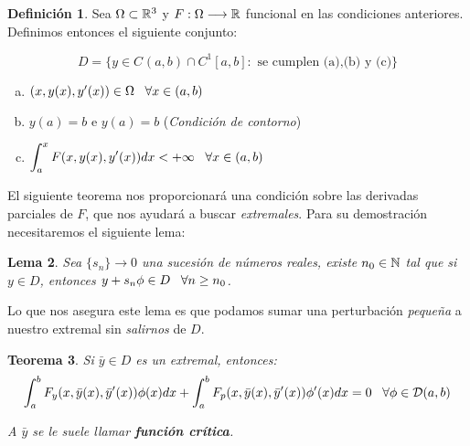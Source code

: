 \documentclass[12pt]{article}
\newtheorem{theorem}{Teorema}
\newtheorem{lemma}[theorem]{Lema}
\theoremstyle{definition}
\newtheorem{definition}[theorem]{Definición}
\theoremstyle{remark}
\newcommand{\continuas}[1][]{C^{ #1 }[a,b]}
\newcommand{\continuasabierto}[1][]{C^{ #1 }(a,b)}
\newcommand{\soportecompacto}{\mathcal{D}(a,b)}
\newcommand{\xcero}{(a,b)}
\newcommand{\fvariaciones}{F(x,y(x),y'(x))}
\begin{document}
\begin{definition} 

Sea $\Omega\subset\mathbb{R}^3$ y $F:\Omega\longrightarrow \mathbb{R}$ funcional en las condiciones anteriores. Definimos entonces el siguiente conjunto:

\begin{equation}\label{espaciofunciones}
D=\{y\in\continuasabierto\cap\continuas[1]: \text{ se cumplen (a),(b) y (c)}\}
\end{equation}

\begin{enumerate}[(a)]

\item $(x,y(x),y'(x))\in\Omega \espacio \forall x\in\xcero$
\item $y(a)=b$ e $y(a)=b$ (\textit{Condición de contorno})
\item $\displaystyle\int_{a}^x\fvariaciones dx<+\infty \espacio \forall x\in \xcero$ 
\end{enumerate}

\end{definition}

El siguiente teorema nos proporcionará una condición sobre las derivadas parciales de $F$, que nos ayudará a buscar \textit{extremales}. Para su demostración necesitaremos el siguiente lema:

\begin{lemma}
\label{lemmatecnico}
Sea $\{s_n\}\longrightarrow 0$ una sucesión de números reales, existe $n_0\in\mathbb{N}$ tal que si $y\in D$, entonces $y+s_n\phi\in D \;\;\; \forall n\geq n_0$.
\end{lemma}

Lo que nos asegura este lema es que podamos sumar una perturbación \textit{pequeña} a nuestro extremal sin \textit{salirnos} de $D$.

\begin{theorem}
\label{theorem:1.7}
Si $\bar{y}\in D$ es un extremal, entonces:
\[
\integral{a}{b}{F_y(x,\bar{y}(x), \bar{y}'(x))}\phi(x)dx+\integral{a}{b}{F_p(x,\bar{y}(x), \bar{y}'(x))}\phi'(x)dx=0 \espacio \forall \phi\in \soportecompacto
\]

A $\bar{y}$ se le suele llamar \textbf{función crítica}.
\end{theorem}
\end{document}
